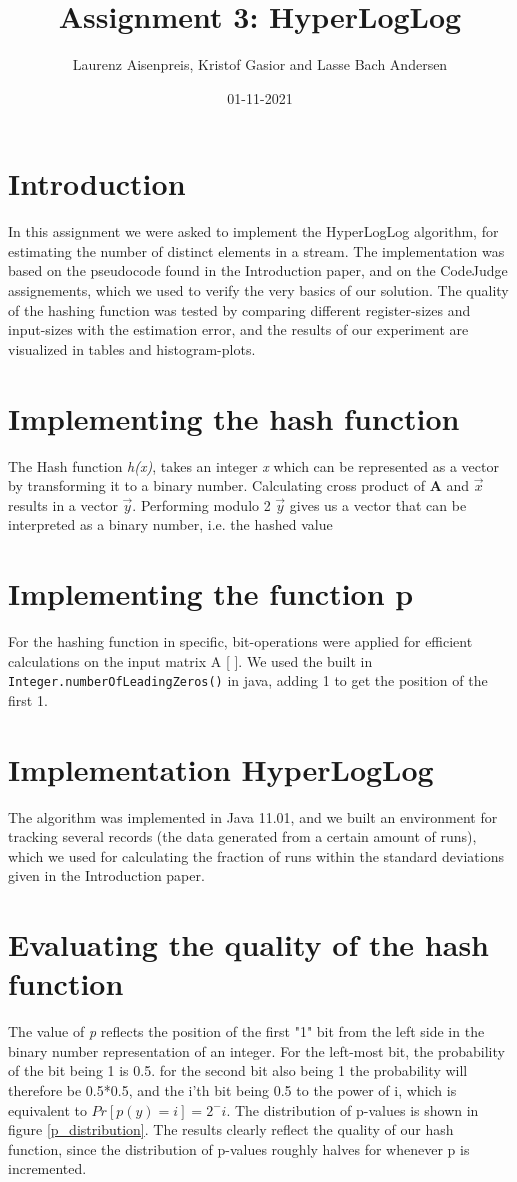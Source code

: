 \documentclass[12pt, a4paper]{article}
\title{Assignment 3: HyperLogLog}
\author{Laurenz Aisenpreis, Kristof Gasior and Lasse Bach Andersen}
\date{01-11-2021}
\begin{document}
\maketitle

\section{Introduction}
In this assignment we were asked to implement the HyperLogLog algorithm, for estimating the number of distinct elements in a stream. The implementation was based on the pseudocode found in the Introduction paper, and on the CodeJudge assignements, which we used to verify the very basics of our solution. The quality of the hashing function was tested by comparing different register-sizes and input-sizes with the estimation error, and the results of our experiment are visualized in tables and histogram-plots.

\section{Implementing the hash function}
The Hash function \textit{h(x)}, takes an integer \textit{x} which can be represented as a vector by transforming it to a binary number. Calculating cross product of $\textbf{A}$ and $\vec{x}$ results in a vector $\vec{y}$. Performing modulo 2 $\vec{y}$ gives us a vector that can be interpreted as a binary number, i.e. the hashed value
\section{Implementing the function p}
For the hashing function in specific, bit-operations were applied for efficient calculations on the input matrix A [ ]. We used the built in\\{\tt Integer.numberOfLeadingZeros()} in java, adding 1 to get the position of the first 1.

\section{Implementation HyperLogLog}
The algorithm was implemented in Java 11.01, and we built an environment for tracking several records (the data generated from a certain amount of runs), which we used for calculating the fraction of runs within the standard deviations given in the Introduction paper.


\section{Evaluating the quality of the hash function}
The value of \emph{p} reflects the position of the first "1" bit from the left side in the binary number representation of an integer. For the left-most bit, the probability of the bit being 1 is 0.5. for the second bit also being 1 the probability will therefore be 0.5*0.5, and the i'th bit being 0.5 to the power of i, which is equivalent to \(Pr[p(y) = i] = 2^-i\). The distribution of p-values is shown in figure \ref{p_distribution}. The results clearly reflect the quality of our hash function, since the distribution of p-values roughly halves for whenever p is incremented. 
\end{document}
